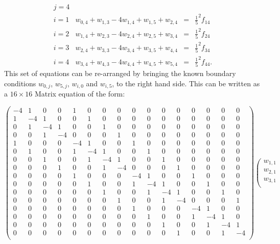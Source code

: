 \[\begin{array}{l|rcl}
j=4\\
i=1&w_{0,4}+w_{1,3}-4w_{1,4}+w_{1,5}+w_{2,4}&=&\frac{1}{5}^2f_{14}\\
i=2&w_{1,4}+w_{2,3}-4w_{2,4}+w_{2,5}+w_{3,4}&=&\frac{1}{5}^2f_{24}\\
i=3&w_{2,4}+w_{3,3}-4w_{3,4}+w_{3,5}+w_{4,4}&=&\frac{1}{5}^2f_{34}\\
i=4&w_{3,4}+w_{4,3}-4w_{4,4}+w_{4,5}+w_{5,4}&=&\frac{1}{5}^2f_{44}.
\end{array}
\]	
This set of equations can be re-arranged by bringing the known boundary conditions $w_{0,j}$, $w_{5,j}$, $w_{i,0}$ and $w_{i,5}$, to the right hand side.
This can be written as a $16\times 16$ Matrix equation of the  form:\\
\begin{sideways}
\parbox{\textheight}{
\[\left(\begin{array}{cccc|cccc|cccc|cccc}
-4& 1 & 0 &0 &1 &0 &0 &0 &0 &0&0&0&0&0&0&0 \\
1&-4& 1   &0 &0 &1 &0 &0 &0 &0&0&0&0&0&0&0\\
0 &1&-4&1&  0&0 &1 &0 &0 &0&0 &0&0 &0&0&0 \\
0&0 &1&-4&0&  0&0 &1 &0 &0 &0&0 &0&0 &0&0 \\
\hline
1&0&0&0&-4& 1 & 0 &0 &1 &0 &0 &0 &0 &0&0&0 \\
0&1&0&0&1&-4& 1   &0 &0 &1 &0 &0 &0 &0&0&0\\
0&0&1&0&0 &1&-4&1&  0&0 &1 &0 &0 &0&0 &0 \\
0&0&0&1&0&0 &1&-4&0&  0&0 &1 &0 &0 &0&0  \\
\hline
0 &0 &0&0&1&0&0&0&-4& 1 & 0 &0 &1 &0 &0 &0 \\
0 &0 &0&0&0&1&0&0&1&-4& 1   &0 &0 &1 &0 &0\\
0 &0 &0&0&0&0&1&0&0 &1&-4&1&  0&0 &1 &0 \\
0 &0 &0&0&0&0&0&1&0&0 &1&-4&0&  0&0 &1   \\
\hline
0 &0 &0&0&0 &0 &0&0&1&0&0&0&-4& 1 & 0 &0  \\
0 &0 &0&0&0 &0 &0&0&0&1&0&0&1&-4& 1   &0 \\
0 &0 &0&0&0 &0 &0&0&0&0&1&0&0 &1&-4&1 \\
0 &0 &0&0&0 &0 &0&0&0&0&0&1&0&0 &1&-4  \\
\end{array}\right)
\left(\begin{array}{c}
w_{1,1}\\
w_{2,1}\\
w_{3,1}\\

\end{array}\]}
\end{sideways}
